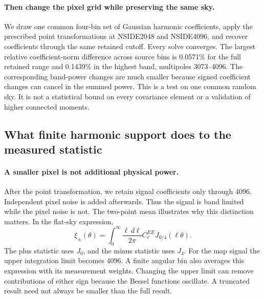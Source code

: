 \documentclass[11pt]{article}
\begin{document}
\paragraph{Then change the pixel grid while preserving the same sky.}
We draw one common four-bin set of Gaussian harmonic coefficients, apply
the prescribed point transformations at NSIDE2048 and NSIDE4096, and
recover coefficients through the same retained cutoff. Every solve
converges. The largest relative coefficient-norm difference across source
bins is 0.0571\% for the full retained range and 0.1439\% in the highest
band, multipoles 3073--4096. The corresponding band-power changes are much
smaller because signed coefficient changes can cancel in the summed power.
This is a test on one common random sky. It is not a statistical bound on
every covariance element or a validation of higher connected moments.

\subsection{What finite harmonic support does to the measured statistic}
\paragraph{A smaller pixel is not additional physical power.}
After the point transformation, we retain signal coefficients only through
4096. Independent pixel noise is added afterwards. Thus the signal is
band limited while the pixel noise is not. The two-point mean illustrates
why this distinction matters. In the flat-sky expression,
\begin{equation}
 \xi_\pm(\theta)=\int_0^\infty\frac{\ell\,d\ell}{2\pi}
 C_\ell^{EE}J_{0/4}(\ell\theta).
\end{equation}
The plus statistic uses $J_0$, and the minus statistic uses $J_4$.
For the map signal the upper integration limit becomes 4096. A finite
angular bin also averages this expression with its measurement weights.
Changing the upper limit can remove contributions of either sign because
the Bessel functions oscillate. A truncated result need not always be
smaller than the full result.
\end{document}
